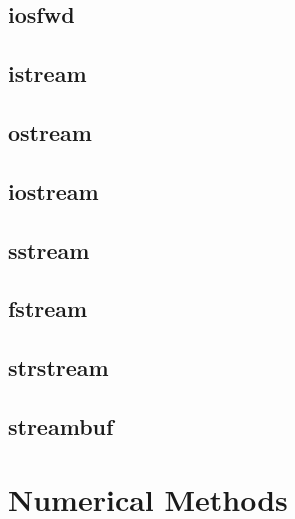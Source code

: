 \documentclass[11pt,a4paper]{article}
\begin{document}
\subsection{iosfwd}
\subsection{istream}
\subsection{ostream}
\subsection{iostream}
\subsection{sstream}
\subsection{fstream}
\subsection{strstream}
\subsection{streambuf}


\newpage
\section{Numerical Methods}
\end{document}
